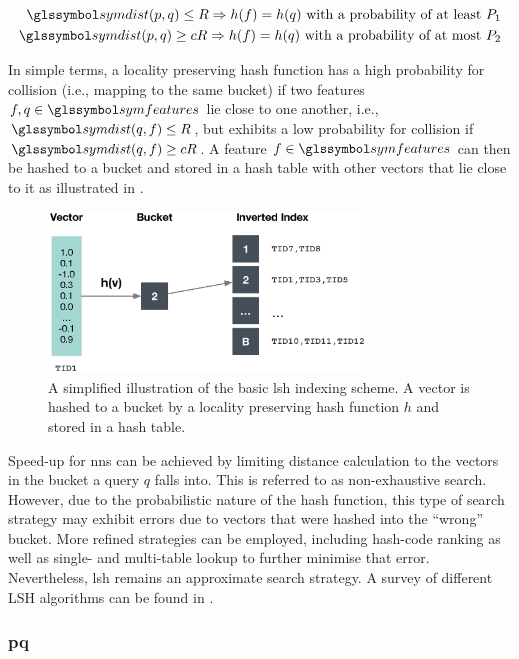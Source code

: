 \begin{eqnarray}
    \symdist (p,q) \leq R \Rightarrow h(f) = h(q) \text{ with a probability of at least } P_1 \label{eq:lsh_1} \\
    \symdist (p,q) \geq cR \Rightarrow h(f) = h(q) \text{ with a probability of at most } P_2 \label{eq:lsh_2}
\end{eqnarray}

In simple terms, a locality preserving hash function has a high probability for collision (i.e., mapping to the same bucket) if two features $f,q \in \symfeatures$ lie close to one another, i.e., $\symdist(q,f) \leq R$, but exhibits a low probability for collision if $\symdist(q,f) \geq cR$. A  feature $f \in \symfeatures$ can then be hashed to a bucket and stored in a hash table with other vectors that lie close to it as illustrated in . 

\begin{figure}[tb]
    \centering
    \includegraphics[width=0.75\textwidth]{figures/lsh}
    \caption{A simplified illustration of the basic \acrshort{lsh} indexing scheme. A vector is hashed to a bucket by a locality preserving hash function $h$ and stored in a hash table.}
    \label{fig:lsh}
\end{figure}

Speed-up for \acrshort{nns} can be achieved by limiting distance calculation to the vectors in the bucket a query $q$ falls into. This is referred to as non-exhaustive search. However, due to the probabilistic nature of the hash function, this type of search strategy may exhibit errors due to vectors that were hashed into the ``wrong'' bucket. More refined strategies can be employed, including hash-code ranking as well as single- and multi-table lookup \cite{Wang:2017ASurvey} to further minimise that error. Nevertheless, \acrshort{lsh} remains an approximate search strategy. A survey of different LSH algorithms can be found in \cite{Wang:2017ASurvey}.

\subsubsection{\texorpdfstring{\acrfull{pq}}{Product Quantisation (PQ)}}
\label{section:index_pq}

